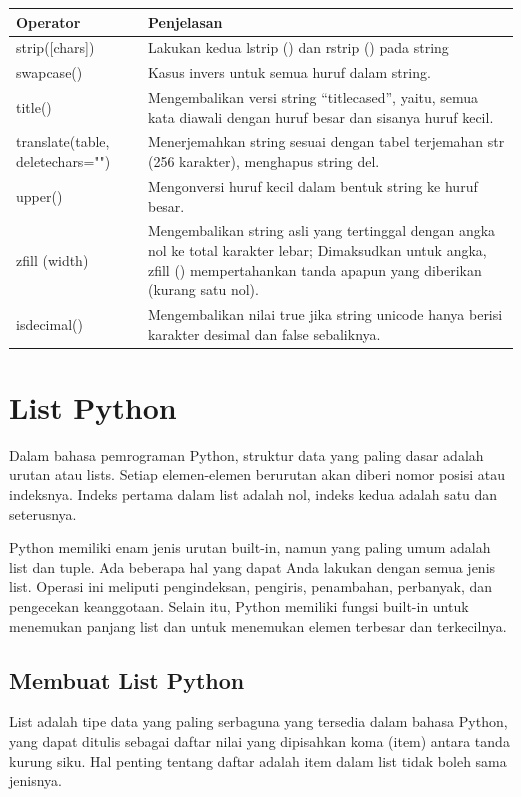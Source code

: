 \begin{center}
\begin{tabular}{ | m{3cm} | m{7cm} | }
\hline
Operator & Penjelasan \\
\hline
strip([chars]) & Lakukan kedua lstrip () dan rstrip () pada string \\
\hline
swapcase() & Kasus invers untuk semua huruf dalam string. \\
\hline
title() & Mengembalikan versi string “titlecased”, yaitu, semua kata diawali dengan huruf besar dan sisanya huruf kecil. \\
\hline
translate(table, deletechars="") & Menerjemahkan string sesuai dengan tabel terjemahan str (256 karakter), menghapus string del. \\
\hline
upper() & Mengonversi huruf kecil dalam bentuk string ke huruf besar. \\
\hline
zfill (width) & Mengembalikan string asli yang tertinggal dengan angka nol ke total karakter lebar; Dimaksudkan untuk angka, zfill () mempertahankan tanda apapun yang diberikan (kurang satu nol). \\
\hline
isdecimal() & Mengembalikan nilai true jika string unicode hanya berisi karakter desimal dan false sebaliknya. \\
\hline
\end{tabular}
\end{center}


\section{List Python}
Dalam bahasa pemrograman Python, struktur data yang paling dasar adalah urutan atau lists. Setiap elemen-elemen berurutan akan diberi nomor posisi atau indeksnya. Indeks pertama dalam list adalah nol, indeks kedua adalah satu dan seterusnya.

Python memiliki enam jenis urutan built-in, namun yang paling umum adalah list dan tuple. Ada beberapa hal yang dapat Anda lakukan dengan semua jenis list. Operasi ini meliputi pengindeksan, pengiris, penambahan, perbanyak, dan pengecekan keanggotaan. Selain itu, Python memiliki fungsi built-in untuk menemukan panjang list dan untuk menemukan elemen terbesar dan terkecilnya.

\subsection{Membuat List Python}
List adalah tipe data yang paling serbaguna yang tersedia dalam bahasa Python, yang dapat ditulis sebagai daftar nilai yang dipisahkan koma (item) antara tanda kurung siku. Hal penting tentang daftar adalah item dalam list tidak boleh sama jenisnya.

